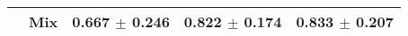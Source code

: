 \begin{tabular}{lllll}
 & Mix & \textcolor[rgb]{0.3919239905,0.5000000000,0}{0.667} $\pm$ \textcolor[rgb]{0.8595019246,0.1404980754,0}{0.246} & \textcolor[rgb]{0.4988009592,0.5000000000,0}{0.822} $\pm$ \textcolor[rgb]{0.8320462826,0.1679537174,0}{0.174} & \textcolor[rgb]{0.2820512821,0.5000000000,0}{0.833} $\pm$ \textcolor[rgb]{0.3957511934,0.5000000000,0}{0.207} \\
\bottomrule
\end{tabular}

